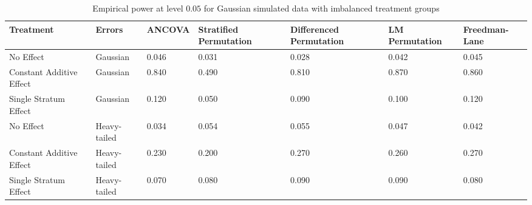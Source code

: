 \begin{table}[ht]
\centering
\begin{tabular}{|p{0.7in}|p{0.6in}p{0.8in}p{0.8in}p{0.8in}p{0.8in}p{0.75in}}
  \hline
Treatment & Errors & ANCOVA & Stratified Permutation & Differenced Permutation & LM Permutation & Freedman-Lane \\ 
  \hline
No Effect & Gaussian & 0.046 & 0.031 & 0.028 & 0.042 & 0.045 \\ 
  Constant Additive Effect & Gaussian & 0.840 & 0.490 & 0.810 & 0.870 & 0.860 \\ 
  Single Stratum Effect & Gaussian & 0.120 & 0.050 & 0.090 & 0.100 & 0.120 \\ 
   \hline
No Effect & Heavy-tailed & 0.034 & 0.054 & 0.055 & 0.047 & 0.042 \\ 
  Constant Additive Effect & Heavy-tailed & 0.230 & 0.200 & 0.270 & 0.260 & 0.270 \\ 
  Single Stratum Effect & Heavy-tailed & 0.070 & 0.080 & 0.090 & 0.090 & 0.080 \\ 
   \hline
\end{tabular}
\caption{Empirical power at level $0.05$ for Gaussian simulated data with imbalanced treatment groups} 
\label{tab:imbalanced_power}
\end{table}
